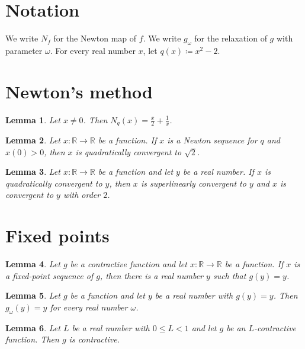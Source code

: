 \documentclass{article}
\newtheorem{lemma}{Lemma}
\begin{document}
\section{Notation}

We write $N_f$ for the Newton map of $f$.
We write $g_\omega$ for the relaxation of $g$ with parameter $\omega$.
For every real number $x$, let $q(x)\coloneqq x^2-2$.

\section{Newton's method}

\begin{lemma}\label{newton}
Let $x\ne0$. Then $N_q(x)=\frac{x}{2}+\frac{1}{x}$.
\end{lemma}

\begin{lemma}\label{sequence}
Let $x:\mathbb{R}\to\mathbb{R}$ be a function. If $x$ is a Newton sequence for $q$ and $x(0)>0$, then $x$ is quadratically convergent to $\sqrt2$.
\end{lemma}

\begin{lemma}\label{orders}
Let $x:\mathbb{R}\to\mathbb{R}$ be a function and let $y$ be a real number. If $x$ is quadratically convergent to $y$, then $x$ is superlinearly convergent to $y$ and $x$ is convergent to $y$ with order $2$.
\end{lemma}

\section{Fixed points}

\begin{lemma}\label{banach}
Let $g$ be a contractive function and let $x:\mathbb{R}\to\mathbb{R}$ be a function. If $x$ is a fixed-point sequence of $g$, then there is a real number $y$ such that $g(y)=y$.
\end{lemma}

\begin{lemma}\label{relaxation}
Let $g$ be a function and let $y$ be a real number with $g(y)=y$. Then $g_\omega(y)=y$ for every real number $\omega$.
\end{lemma}

\begin{lemma}\label{constant}
Let $L$ be a real number with $0\le L<1$ and let $g$ be an $L$-contractive function. Then $g$ is contractive.
\end{lemma}
\end{document}
